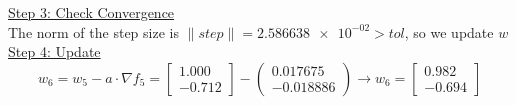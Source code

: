\underline{Step 3: Check Convergence}\\
The norm of the step size is $\| step \| = \num{2.586638e-02} > tol$, so we update $w$
\\[4mm]

\underline{Step 4: Update}
\[ 
w_6 = w_5 - a\cdot \nabla f_5 =  \left[\begin{array}{c}
	1.000\\
	-0.712
\end{array}\right] - \left(\begin{array}{c}
	0.017675 \\
	-0.018886
\end{array}\right) \rightarrow
w_6 = \left[\begin{array}{c}
	0.982\\
	-0.694
\end{array}\right]
\]
\\[4mm]







